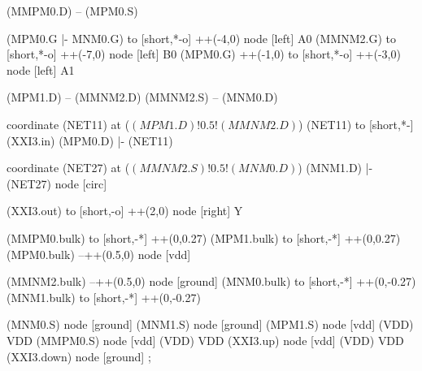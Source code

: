 \begin{circuitikz}[american]
	(MMPM0.D) -- (MPM0.S)
	
	(MPM0.G |- MNM0.G) to [short,*-o] ++(-4,0) node [left] {A0}
	(MMNM2.G) to [short,*-o] ++(-7,0) node [left] {B0}
	(MPM0.G) ++(-1,0) to [short,*-o] ++(-3,0) node [left] {A1}
	
	(MPM1.D) -- (MMNM2.D)
	(MMNM2.S) -- (MNM0.D)
	
	coordinate (NET11) at ($(MPM1.D)!0.5!(MMNM2.D)$)
	(NET11) to [short,*-] (XXI3.in)
	(MPM0.D) |- (NET11)
	
	coordinate (NET27) at ($(MMNM2.S)!0.5!(MNM0.D)$)
	(MNM1.D) |- (NET27) node [circ] {}
	
	(XXI3.out) to [short,-o] ++(2,0) node [right] {Y}
	
	(MMPM0.bulk) to [short,-*] ++(0,0.27)
	(MPM1.bulk) to [short,-*] ++(0,0.27)	
	(MPM0.bulk) --++(0.5,0) node [vdd]{}
	
	(MMNM2.bulk) --++(0.5,0) node [ground]{}
	(MNM0.bulk) to [short,-*] ++(0,-0.27)
	(MNM1.bulk) to [short,-*] ++(0,-0.27)	
	

	(MNM0.S) node [ground] {}
	(MNM1.S) node [ground] {}
	(MPM1.S) node [vdd] (VDD) {VDD}
	(MMPM0.S) node [vdd] (VDD) {VDD}
	(XXI3.up) node [vdd] (VDD) {VDD}
	(XXI3.down) node [ground] {}
;

\end{circuitikz}

